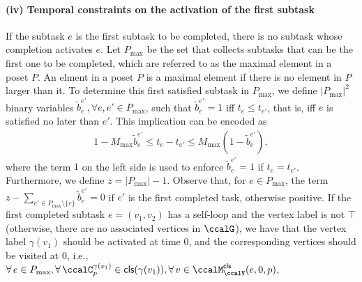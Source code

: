\documentclass[Afour,sageh,times]{sagej}
\newcommand{\clause}[1]{\mathsf{cls}(#1)}
\begin{document}
{{{%

\paragraph{(iv) Temporal constraints on the activation of the first subtask}
If the subtask $e$ is the first subtask to be completed, there is no subtask whose completion activates $e$. Let $P_{\text{max}}$ be the set that collects subtasks that can be the first one to be completed, which are referred to as the maximal element in a poset $P$. An elment in a poset $P$ is a maximal element if there is no element in $P$ larger than it. To determine this first satisfied subtask in $P_{\text{max}}$, we define $|P_{\text{max}}|^2$ binary variables $\tilde{b}_{e}^{e'}, \forall e, e' \in P_{\text{max}}$,  such that $\tilde{b}_{e}^{e'}=1$  iff $t_{e} \leq t_{e'}$, that is, iff $e$ is satisfied no later than  $e'$. This implication can be encoded as
\begingroup\makeatletter\def\f@size{10}\check@mathfonts
\def\maketag@@@#1{\hbox{\m@th\normalsize\normalfont#1}}%
\begin{align}
  1 -  M_{\text{max}} \tilde{b}_{e}^{e'} \leq t_{e} -  t_{e'} \leq M_{\text{max}} (1- \tilde{b}_{e}^{e'}) ,
\end{align}
  \endgroup
  where the term $1$ on the left side  is used to enforce $\tilde{b}_{e}^{e'}=1$ if $t_{e} = t_{e'}$. Furthermore, we define $z = |P_{\text{max}}| -1$. Observe that, for $e \in P_{\text{max}} $, the term $z -  \sum_{e' \in P_{\text{max}}\setminus \{e\}  } \tilde{b}_{e}^{e'} = 0$ if $e'$ is the first completed task, otherwise  positive. If the first completed subtask $e = (v_1 ,v_2)$ has a self-loop and the vertex label is not $\top$ (otherwise, there are no associated vertices in $\ccalG$), we have that the vertex label $\gamma(v_1)$ should be activated at time 0, and the corresponding vertices should be visited at 0,   i.e., $\forall\, e \in P_{\text{max}}, \forall\, \ccalC_p^{\gamma(v_1)} \in \clause{\gamma(v_1)}, \forall \,v \in \ccalM^\mathsf{cls}_\ccalV(e,0,p)$,
}}}
\end{document}
